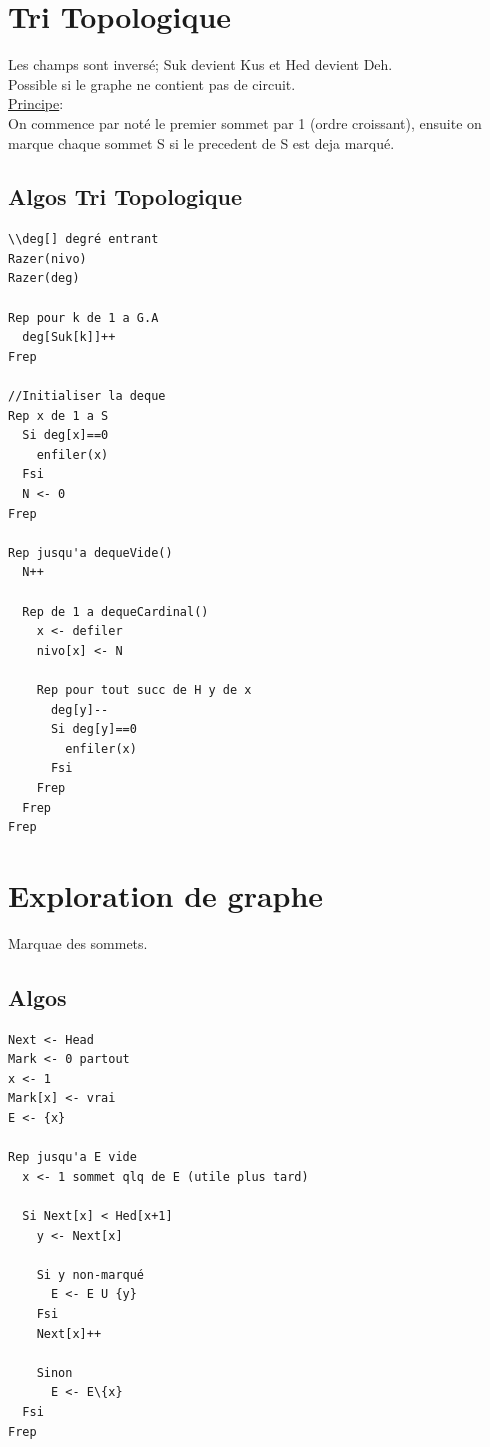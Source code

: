 \documentclass[a4paper,12pt,openany]{book}
\begin{document}

\section{Tri Topologique}

Les champs sont inversé; Suk devient Kus et Hed devient Deh.\\
Possible si le graphe ne contient pas de circuit.\\

\underline{Principe}:\\
On commence par noté le premier sommet par 1 (ordre croissant), ensuite on marque chaque sommet S si le precedent de S est deja marqué.\\


\subsection{Algos Tri Topologique}
\begin{verbatim}
\\deg[] degré entrant 
Razer(nivo)
Razer(deg)

Rep pour k de 1 a G.A
  deg[Suk[k]]++
Frep

//Initialiser la deque
Rep x de 1 a S
  Si deg[x]==0
    enfiler(x)
  Fsi
  N <- 0
Frep

Rep jusqu'a dequeVide()
  N++

  Rep de 1 a dequeCardinal()
    x <- defiler
    nivo[x] <- N

    Rep pour tout succ de H y de x
      deg[y]--
      Si deg[y]==0
        enfiler(x)
      Fsi
    Frep
  Frep
Frep
\end{verbatim}


\section{Exploration de graphe}

Marquae des sommets.\\


\subsection{Algos }
\begin{verbatim}
Next <- Head
Mark <- 0 partout
x <- 1
Mark[x] <- vrai
E <- {x}

Rep jusqu'a E vide
  x <- 1 sommet qlq de E (utile plus tard)

  Si Next[x] < Hed[x+1]
    y <- Next[x]

    Si y non-marqué
      E <- E U {y}
    Fsi
    Next[x]++
    
    Sinon
      E <- E\{x}
  Fsi
Frep
\end{verbatim}
\end{document}

